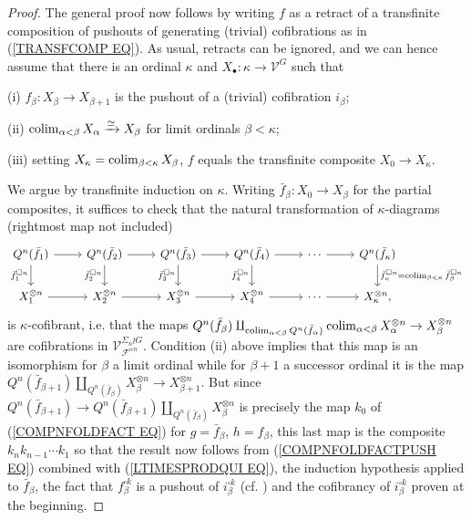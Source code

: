 \documentclass[a4paper,10pt]{article}%
\begin{document}
\begin{proof}
The general proof now follows by writing $f$ as a retract of a transfinite composition of pushouts of generating (trivial) cofibrations as in (\ref{TRANSFCOMP EQ}).
As usual, retracts can be ignored, and we can hence assume that there is an ordinal $\kappa$
and $X_{\bullet} \colon \kappa \to \mathcal{V}^G$
such that 
\begin{inparaenum}
\item[(i)] 
$f_{\beta} \colon X_{\beta} \to X_{\beta+1}$
is the pushout of a (trivial) cofibration $i_{\beta}$;
\item[(ii)] 
$\operatorname{colim}_{\alpha < \beta} X_{\alpha} \xrightarrow{\simeq} X_{\beta}$ for limit ordinals $\beta < \kappa$;
\item[(iii)] setting 
$X_{\kappa} = \operatorname{colim}_{\beta < \kappa} X_{\beta}$, 
$f$ equals the transfinite composite $X_0 \to X_{\kappa}$.
\end{inparaenum}


We argue by transfinite induction on $\kappa$.
Writing $\bar{f}_{\beta} \colon X_0 \to X_{\beta}$ for the partial composites, it suffices to check that the natural transformation of $\kappa$-diagrams (rightmost map not included)
\[
\begin{tikzcd}
		Q^n(\bar{f}_{1}) \ar{d}[swap]{\bar{f}_1^{\square n}} \ar{r}
	&
		Q^n(\bar{f}_{2}) \ar{d}[swap]{\bar{f}_2^{\square n}} \ar{r}
	&
		Q^n(\bar{f}_{3}) \ar{d}[swap]{\bar{f}_3^{\square n}} \ar{r}
	&
		Q^n(\bar{f}_{4}) \ar{d}[swap]{\bar{f}_4^{\square n}} \ar{r}
	&
		\cdots \ar{r}
	&
		Q^n(\bar{f}_{\kappa}) \ar{d}{\bar{f}_{\kappa}^{\square n}
		=\colim_{\beta < \kappa} \bar{f}_{\beta}^{\square n}}
\\
		X_1^{\otimes n} \ar{r}
	&
		X_2^{\otimes n} \ar{r}
	&
		X_3^{\otimes n} \ar{r}
	&
		X_4^{\otimes n} \ar{r}
	&
		\cdots \ar{r}
	&
		X_{\kappa}^{\otimes n},
\end{tikzcd}
\]
is $\kappa$-cofibrant, i.e. that the maps 
$Q^n(\bar{f}_{\beta})
\amalg_{\operatorname{colim}_{\alpha < \beta} Q^n(\bar{f}_{\alpha}) }
\operatorname{colim}_{\alpha < \beta} X_{\alpha}^{\otimes n} 
	\to
X_{\beta}^{\otimes n} 
$ are cofibrations in 
$\mathcal{V}^{\Sigma_n \wr G}_{\mathcal{F}^{\ltimes n}}$.
Condition (ii) above implies that this map is an isomorphism for $\beta$ a limit ordinal 
while for $\beta+1$ a successor ordinal it is the map
$Q^n(\bar{f}_{\beta+1})
\amalg_{Q^n(\bar{f}_{\beta}) }
X_{\beta}^{\otimes n} 
	\to
X_{\beta+1}^{\otimes n}$.
But since 
$Q^n(\bar{f}_{\beta+1}) \to Q^n(\bar{f}_{\beta+1})
\amalg_{Q^n(\bar{f}_{\beta}) }
X_{\beta}^{\otimes n}$ 
is precisely the map $k_0$ of (\ref{COMPNFOLDFACT EQ}) for 
$g=\bar{f}_{\beta}$, $h=f_{\beta}$, this last map is the composite $k_nk_{n-1}\cdots k_1$ so that the result now follows from (\ref{COMPNFOLDFACTPUSH EQ}) combined with 
(\ref{LTIMESPRODQUI EQ}), the induction hypothesis applied to $\bar{f}_{\beta}$, the fact that $f_{\beta}^{\square k}$ is a pushout of $i_{\beta}^{\square k}$
(cf. \cite[Lemma 4.11]{Pe16}) and the cofibrancy of $i_{\beta}^{\square k}$ proven at the beginning.
\end{proof}
\end{document}
